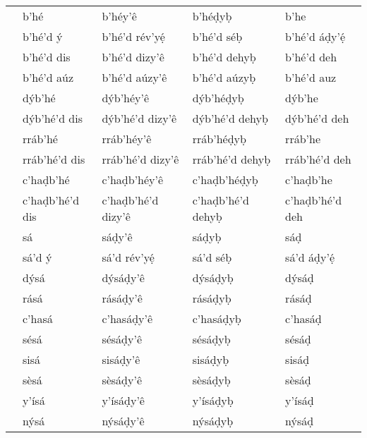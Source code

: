 \documentclass[a4paper, 12pt, twoside, final]{article}
\let \nf \normalfont
\begin{document}
{\begin{longtable}{>{\nf}l|l|l|l|l}
    20     & b’hé            & b’héy’ê            & b’héḍyḅ           & b’he            \\
    21     & b’hé’d ý        & b’hé’d rév’yẹ́      & b’hé’d séḅ        & b’hé’d áḍy’ẹ́    \\
    30     & b’hé’d dis      & b’hé’d dizy’ê      & b’hé’d dehyḅ      & b’hé’d deh      \\
    31     & b’hé’d aúz      & b’hé’d aúzy’ê      & b’hé’d aúzyḅ      & b’hé’d auz      \\
    40     & dýb’hé          & dýb’héy’ê          & dýb’héḍyḅ         & dýb’he          \\
    50     & dýb’hé’d dis    & dýb’hé’d dizy’ê    & dýb’hé’d dehyḅ    & dýb’hé’d deh    \\
    60     & rráb’hé         & rráb’héy’ê         & rráb’héḍyḅ        & rráb’he         \\
    70     & rráb’hé’d dis   & rráb’hé’d dizy’ê   & rráb’hé’d dehyḅ   & rráb’hé’d deh   \\
    80     & c’haḍb’hé       & c’haḍb’héy’ê       & c’haḍb’héḍyḅ      & c’haḍb’he       \\
    90     & c’haḍb’hé’d dis & c’haḍb’hé’d dizy’ê & c’haḍb’hé’d dehyḅ & c’haḍb’hé’d deh \\\hline
    100    & sá              & sáḍy’ê             & sáḍyḅ             & sáḍ             \\
    101    & sá’d ý          & sá’d rév’yẹ́        & sá’d séḅ          & sá’d áḍy’ẹ́      \\
    200    & dýsá            & dýsáḍy’ê           & dýsáḍyḅ           & dýsáḍ           \\
    300    & rásá            & rásáḍy’ê           & rásáḍyḅ           & rásáḍ           \\
    400    & c’hasá          & c’hasáḍy’ê         & c’hasáḍyḅ         & c’hasáḍ         \\
    500    & sésá            & sésáḍy’ê           & sésáḍyḅ           & sésáḍ           \\
    600    & sisá            & sisáḍy’ê           & sisáḍyḅ           & sisáḍ           \\
    700    & sèsá            & sèsáḍy’ê           & sèsáḍyḅ           & sèsáḍ           \\
    800    & y’ísá           & y’ísáḍy’ê          & y’ísáḍyḅ          & y’ísáḍ          \\
    900    & nýsá            & nýsáḍy’ê           & nýsáḍyḅ           & nýsáḍ           \\\hline

\end{longtable}}
\end{document}
